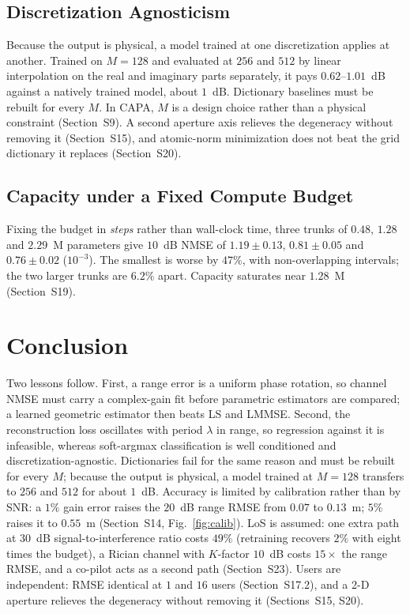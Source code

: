 \documentclass[journal]{IEEEtran}
\begin{document}
\subsection{Discretization Agnosticism}

Because the output is physical, a model trained at one discretization applies at another. Trained on $M=\!128$ and evaluated at $256$ and $512$ by linear interpolation on the real and imaginary parts separately, it pays $0.62$--$1.01$~dB against a natively trained model, about $1$~dB. Dictionary baselines must be rebuilt for every $M$. In CAPA, $M$ is a design choice rather than a physical constraint (Section~S9). A second aperture axis relieves the degeneracy without removing it (Section~S15), and atomic-norm minimization does not beat the grid dictionary it replaces (Section~S20).

\subsection{Capacity under a Fixed Compute Budget}

Fixing the budget in \emph{steps} rather than wall-clock time, three trunks of $0.48$, $1.28$ and $2.29$~M parameters give $10$~dB NMSE of $1.19\pm0.13$, $0.81\pm0.05$ and $0.76\pm0.02$ ($10^{-3}$). The smallest is worse by $47\%$, with non-overlapping intervals; the two larger trunks are $6.2\%$ apart. Capacity saturates near $1.28$~M (Section~S19).

\FloatBarrier
\section{Conclusion}

Two lessons follow. First, a range error is a uniform phase rotation, so channel NMSE must carry a complex-gain fit before parametric estimators are compared; a learned geometric estimator then beats LS and LMMSE. Second, the reconstruction loss oscillates with period $\lambda$ in range, so regression against it is infeasible, whereas soft-argmax classification is well conditioned and discretization-agnostic. Dictionaries fail for the same reason and must be rebuilt for every $M$; because the output is physical, a model trained at $M=128$ transfers to $256$ and $512$ for about $1$~dB. Accuracy is limited by calibration rather than by SNR: a $1\%$ gain error raises the $20$~dB range RMSE from $0.07$ to $0.13$~m; $5\%$ raises it to $0.55$~m (Section~S14, Fig.~\ref{fig:calib}). LoS is assumed: one extra path at $30$~dB signal-to-interference ratio costs $49\%$ (retraining recovers $2\%$ with eight times the budget), a Rician channel with $K$-factor $10$~dB costs $15\times$ the range RMSE, and a co-pilot acts as a second path (Section~S23). Users are independent: RMSE identical at $1$ and $16$ users (Section~S17.2), and a 2-D aperture relieves the degeneracy without removing it (Sections~S15, S20).
\end{document}
